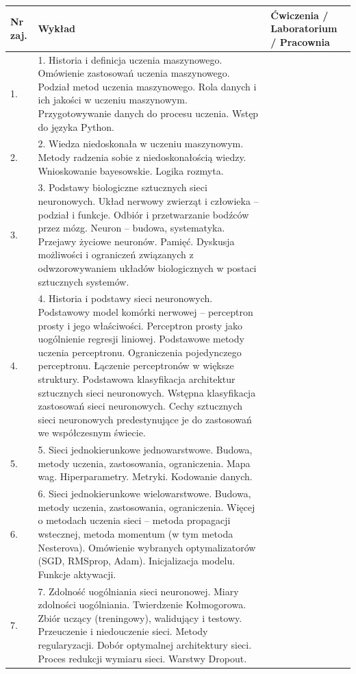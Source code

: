 \documentclass[12pt, a4paper]{article}
\begin{document}
\begin{longtable}{|p{1.5cm}|p{6.5cm}|p{6.5cm}|}
\hline
\textbf{Nr zaj.} & \textbf{Wykład} & \textbf{Ćwiczenia / Laboratorium / Pracownia} \\\hline
\endhead
  \hline
  1. & 1.  Historia i definicja uczenia maszynowego. Omówienie zastosowań uczenia maszynowego. Podział metod uczenia maszynowego. Rola danych i ich jakości w uczeniu maszynowym. Przygotowywanie danych do procesu uczenia. Wstęp do języka Python. &  \\
  \hline
  2. & 2.  Wiedza niedoskonała w uczeniu maszynowym. Metody radzenia sobie z niedoskonałością wiedzy. Wnioskowanie bayesowskie. Logika rozmyta. &  \\
  \hline
  3. & 3. Podstawy biologiczne sztucznych sieci neuronowych. Układ nerwowy zwierząt i człowieka –  podział i funkcje. Odbiór i przetwarzanie bodźców przez mózg. Neuron – budowa, systematyka. Przejawy życiowe neuronów. Pamięć.  Dyskusja możliwości i ograniczeń związanych z odwzorowywaniem układów biologicznych w postaci sztucznych systemów. &  \\
  \hline
  4. & 4.  Historia i podstawy sieci neuronowych. Podstawowy model komórki nerwowej – perceptron prosty i jego właściwości. Perceptron prosty jako uogólnienie regresji liniowej. Podstawowe metody uczenia perceptronu. Ograniczenia pojedynczego perceptronu. Łączenie perceptronów w większe struktury. Podstawowa klasyfikacja architektur sztucznych sieci neuronowych. Wstępna klasyfikacja zastosowań sieci neuronowych. Cechy sztucznych sieci neuronowych predestynujące je do zastosowań we współczesnym świecie. &  \\
  \hline
  5. & 5.  Sieci jednokierunkowe jednowarstwowe. Budowa, metody uczenia, zastosowania, ograniczenia. Mapa wag.  Hiperparametry. Metryki. Kodowanie danych. &  \\
  \hline
  6. & 6. Sieci jednokierunkowe wielowarstwowe. Budowa, metody uczenia, zastosowania, ograniczenia. Więcej o metodach uczenia sieci – metoda propagacji wstecznej, metoda momentum (w tym metoda Nesterova). Omówienie wybranych optymalizatorów (SGD, RMSprop, Adam). Inicjalizacja modelu. Funkcje aktywacji. &  \\
  \hline
  7. & 7.  Zdolność uogólniania sieci neuronowej. Miary zdolności uogólniania. Twierdzenie Kołmogorowa. Zbiór uczący (treningowy), walidujący i testowy. Przeuczenie i niedouczenie sieci. Metody regularyzacji. Dobór optymalnej architektury sieci. Proces redukcji wymiaru sieci. Warstwy Dropout. &  \\

\end{longtable}
\end{document}
